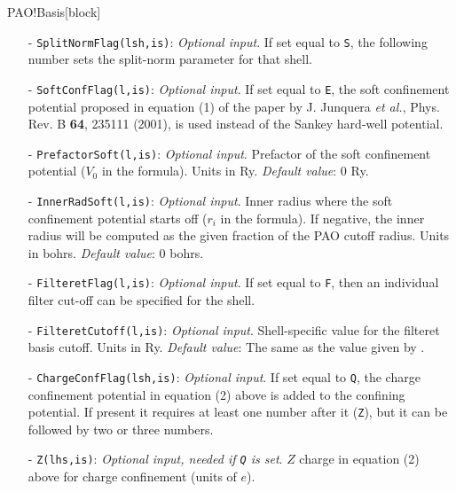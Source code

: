 \begin{fdfentry}{PAO!Basis}[block]
\begin{itemize}
    \item[-]%
    \texttt{SplitNormFlag(lsh,is)}:
    \textit{Optional input}. If set equal to \texttt{S}, the following
    number sets the split-norm parameter for that shell.

    \item[-]%
    \texttt{SoftConfFlag(l,is)}: \textit{Optional input}. If set equal to
    \texttt{E}, the soft confinement potential proposed in equation
    (1) of the paper by J. Junquera \textit{et al.}, Phys. Rev. B
    \textbf{64}, 235111 (2001), is used instead of the Sankey
    hard-well potential.

    \item[-]%
    \texttt{PrefactorSoft(l,is)}: \textit{Optional input}. Prefactor
    of the soft confinement potential ($V_{0}$ in the formula). Units
    in Ry.  \textit{Default value}: 0 Ry.

    \item[-]%
    \texttt{InnerRadSoft(l,is)}: \textit{Optional input}. Inner radius
    where the soft confinement potential starts off ($r_{i}$ in the
    formula).  If negative, the inner radius will be computed as the
    given fraction of the PAO cutoff radius.  Units in
    bohrs. \textit{Default value}: 0 bohrs.

    \item[-]%
    \texttt{FilteretFlag(l,is)}:
    \textit{Optional input}. If set equal to \texttt{F}, then an
    individual filter cut-off can be specified for the shell.

    \item[-]%
    \texttt{FilteretCutoff(l,is)}: \textit{Optional
        input}. Shell-specific value for the filteret basis
    cutoff. Units in Ry.  \textit{Default value}: The same as the
    value given by .

    \item[-]%
    \texttt{ChargeConfFlag(lsh,is)}: \textit{Optional input}. If set
    equal to \texttt{Q}, the charge confinement potential in equation
    (2) above is added to the confining potential. If present it
    requires at least one number after it (\texttt{Z}), but it can be
    followed by two or three numbers.  

    \item[-]%
    \texttt{Z(lhs,is)}: \textit{Optional input, needed if \texttt{Q}
        is set}. $Z$ charge in equation (2) above for charge
    confinement (units of $e$).


\end{itemize}
\end{fdfentry}
